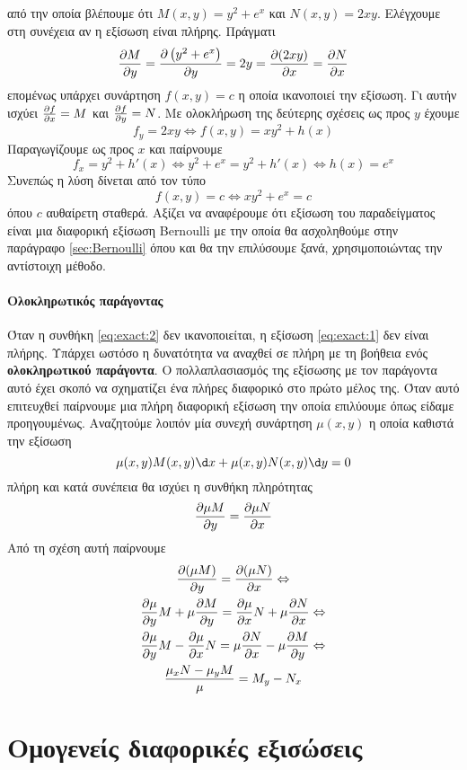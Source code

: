 \documentclass[11pt,a4paper,twoside]{book}
\newcommand{\eng}[1]{\selectlanguage{english}#1\selectlanguage{greek}}
\begin{document}
από την οποία βλέπουμε ότι $M(x,y)=y^2+e^x$ και $N(x,y)=2xy$. Ελέγχουμε στη συνέχεια αν η εξίσωση είναι πλήρης. Πράγματι
\[ \diffp{M}{y}=\diffp{\left(y^2+e^x\right)}{y}=2y=\diffp{(2xy)}{x}=\diffp{N}{x} \]
επομένως υπάρχει συνάρτηση $f(x,y)=c$ η οποία ικανοποιεί την εξίσωση. Γι αυτήν ισχύει $\diffp{f}{x}=M$ και $\diffp{f}{y}=N$. Με ολοκλήρωση της δεύτερης σχέσεις ως προς $y$ έχουμε
\[ f_y=2xy\Leftrightarrow f(x,y)=xy^2+h(x) \]
Παραγωγίζουμε ως προς $x$ και παίρνουμε
\[ f_x=y^2+h'(x)\Leftrightarrow y^2+e^x=y^2+h'(x)\Leftrightarrow h(x)=e^x \]
Συνεπώς η λύση δίνεται από τον τύπο
\[ f(x,y)=c\Leftrightarrow xy^2+e^x=c \]
όπου $c$ αυθαίρετη σταθερά. Αξίζει να αναφέρουμε ότι εξίσωση του παραδείγματος είναι μια διαφορική εξίσωση \eng{Bernoulli} με την οποία θα ασχοληθούμε στην παράγραφο \ref{sec:Bernoulli} όπου και θα την επιλύσουμε ξανά, χρησιμοποιώντας την αντίστοιχη μέθοδο.
\paragraph{Ολοκληρωτικός παράγοντας}
Όταν η συνθήκη \eqref{eq:exact:2} δεν ικανοποιείται, η εξίσωση \eqref{eq:exact:1} δεν είναι πλήρης. Υπάρχει ωστόσο η δυνατότητα να αναχθεί σε πλήρη με τη βοήθεια ενός \textbf{ολοκληρωτικού παράγοντα}. Ο πολλαπλασιασμός της εξίσωσης με τον παράγοντα αυτό έχει σκοπό να σχηματίζει ένα πλήρες διαφορικό στο πρώτο μέλος της. Όταν αυτό επιτευχθεί παίρνουμε μια πλήρη διαφορική εξίσωση την οποία επιλύουμε όπως είδαμε προηγουμένως. Αναζητούμε λοιπόν μία συνεχή συνάρτηση $\mu(x,y)$ η οποία καθιστά την εξίσωση
\begin{equation}
\mu(x,y) M(x,y)\d x+\mu(x,y)N(x,y)\d y=0
\end{equation}
πλήρη και κατά συνέπεια θα ισχύει η συνθήκη πληρότητας
\[ \diffp{\mu M}{y}=\diffp{\mu N}{x} \]
Από τη σχέση αυτή παίρνουμε
\begin{gather}
\diffp{(\mu M)}{y}=\diffp{(\mu N)}{x}\Leftrightarrow\nonumber\\
\diffp{\mu}{y}M+\mu\diffp{M}{y}=\diffp{\mu}{x}N+\mu\diffp{N}{x}\Leftrightarrow\nonumber\\
\diffp{\mu}{y}M-\diffp{\mu}{x}N=\mu\diffp{N}{x}-\mu\diffp{M}{y}\Leftrightarrow\nonumber\\
\frac{\mu_x N-\mu_y M}{\mu}=M_y-N_x\label{eq:exact:7}
\end{gather}
\section{Ομογενείς διαφορικές εξισώσεις}
\lipsum[1]
\end{document}
